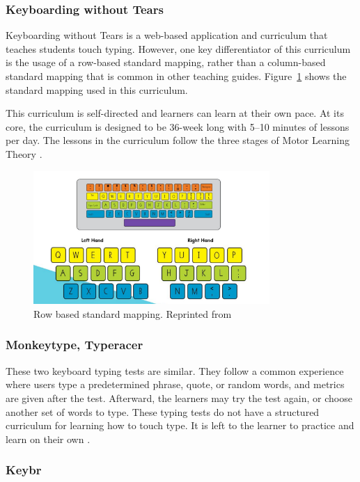 \documentclass{report}
\begin{document}
\subsubsection{Keyboarding without Tears}

Keyboarding without Tears is a web-based application and curriculum that teaches
students touch typing. However, one key differentiator of this curriculum is the
usage of a row-based standard mapping, rather than a column-based standard
mapping that is common in other teaching guides. Figure~\ref{fig:kwt} shows the
standard mapping used in this curriculum.

This curriculum is self-directed and learners can learn at their own pace. At
its core, the curriculum is designed to be 36-week long with 5--10 minutes of
lessons per day. The lessons in the curriculum follow the three stages of
Motor Learning Theory \parencite{kwt}.

\begin{figure}[H]
	\centering
	\includegraphics[width=0.8\textwidth]{kwt.png}
	\caption{Row based standard mapping. Reprinted from }
	\label{fig:kwt}
	\centering
\end{figure}


\subsubsection{Monkeytype, Typeracer}

These two keyboard typing tests are similar. They follow a common experience
where users type a predetermined phrase, quote, or random words, and metrics are
given after the test. Afterward, the learners may try the test again, or choose
another set of words to type. These typing tests do not have a structured
curriculum for learning how to touch type. It is left to the learner to practice
and learn on their own \parencite{bartnik2021, typeracer}.

\subsubsection{Keybr}
\end{document}

